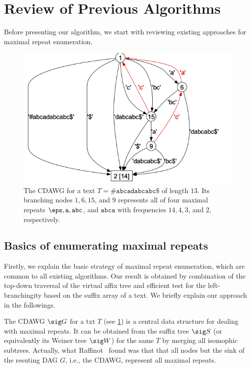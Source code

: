 
\section{Review of Previous Algorithms}
\label{sec:review}

Before presenting our algorithm, we start with reviewing existing approaches for maximal repeat enumeration. 



\begin{figure}[t]
  \centering
  \includegraphics[height=0.4\textwidth]{fig/exp1/cdawg.png}
  \medskip 
  \caption{The CDAWG for a text $T = \mathtt{\#abcadabcabc\$}$ of length $13$. Its branching nodes $1, 6, 15$, and $9$ represents all of four maximal repeats $\eps, \mathtt{a}, \mathtt{abc}$, and $\mathtt{abca}$ with frequencies $14, 4, 3$, and $2$, respectively.
  }\label{fig:cdawg}
\end{figure}


\subsection{Basics of enumerating maximal repeats}
Firstly, we explain the basic strategy of maximal repeat enumeration, which are common to all existing algorithms. 
Our result is obtained by combination of the top-down traversal of the virtual affix tree and efficient test for the left-branchingity based on the suffix array of a text. 
We briefly explain our approach in the followings. 

The CDAWG $\sig G$ for a txt $T$ (see \cref{fig:cdawg}) is a central data structure for dealing with  maximal repeats. It can be obtained from the suffix tree $\sig S$ (or equivalently its Weiner tree $\sig W$) for the same $T$ by merging all isomophic subtrees. Actually, what Raffinot~\cite{raffinot2001maximal} found was that that all nodes but the sink of the resuting DAG $G$, i.e., the CDAWG, represent all maximal repeats. 

